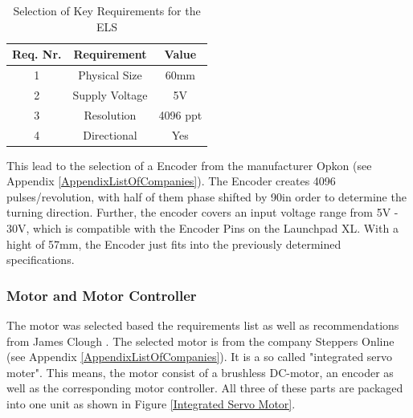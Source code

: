 \begin{table}
    \centering
     \begin{tabular}{||c|c|c||} 
        \hline
        Req. Nr. & Requirement & Value\\ [0.5ex] 
        \hline\hline
        1 & Physical Size       & 60mm		\\ 
        2 & Supply Voltage      & 5V        \\
        3 & Resolution          & 4096 ppt  \\
        4 & Directional         & Yes       \\[1ex] 
        \hline
     \end{tabular}
     \caption{Selection of Key Requirements for the ELS}
     \label{Tab Encoder Key Requirements}
\end{table}

This lead to the selection of a Encoder from the manufacturer Opkon (see Appendix \ref{AppendixListOfCompanies}). The Encoder creates 4096 pulses/revolution, with half of them phase shifted by 90\degree in order to determine the turning direction. Further, the encoder covers an input voltage range from 5V - 30V, which is compatible with the Encoder Pins on the Launchpad XL. With a hight of 57mm, the Encoder just fits into the previously determined specifications.

\subsubsection{Motor and Motor Controller}
The motor was selected based the requirements list as well as recommendations from James Clough \cite{CloughELS}. The selected motor is from the company Steppers Online (see Appendix \ref{AppendixListOfCompanies}). It is a so called "integrated servo moter". This means, the motor consist of a brushless DC-motor, an encoder as well as the corresponding motor controller. All three of these parts are packaged into one unit as shown in Figure \ref{Integrated Servo Motor}.\\

